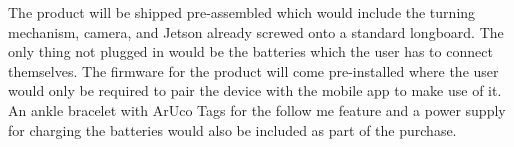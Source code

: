 The product will be shipped pre-assembled which would include the turning mechanism, camera, and Jetson already screwed onto a standard longboard. The only thing not plugged in would be the batteries which the user has to connect themselves. The firmware for the product will come pre-installed where the user would only be required to pair the device with the mobile app to make use of it. An ankle bracelet with ArUco Tags for the follow me feature and a power supply for charging the batteries would also be included as part of the purchase.


